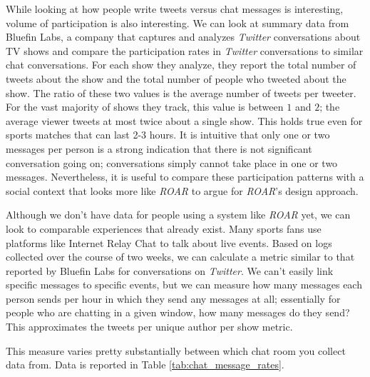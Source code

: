 While looking at how people write tweets versus chat messages is interesting, volume of participation is also interesting. We can look at summary data from Bluefin Labs, a company that captures and analyzes \emph{Twitter} conversations about TV shows and compare the participation rates in \emph{Twitter} conversations to similar chat conversations. For each show they analyze, they report the total number of tweets about the show and the total number of people who tweeted about the show. The ratio of these two values is the average number of tweets per tweeter. For the vast majority of shows they track, this value is between $1$ and $2$; the average viewer tweets at most twice about a single show. This holds true even for sports matches that can last 2-3 hours. It is intuitive that only one or two messages per person is a strong indication that there is not significant conversation going on; conversations simply cannot take place in one or two messages. Nevertheless, it is useful to compare these participation patterns with a social context that looks more like \emph{ROAR} to argue for \emph{ROAR}'s design approach.


Although we don't have data for people using a system like \emph{ROAR} yet, we can look to comparable experiences that already exist. Many sports fans use platforms like Internet Relay Chat to talk about live events. Based on logs collected over the course of two weeks, we can calculate a metric similar to that reported by Bluefin Labs for conversations on \emph{Twitter}. We can't easily link specific messages to specific events, but we can measure how many messages each person sends per hour in which they send any messages at all; essentially for people who are chatting in a given window, how many messages do they send? This approximates the tweets per unique author per show metric. 

This measure varies pretty substantially between which chat room you collect data from. Data is reported in Table \ref{tab:chat_message_rates}. 



